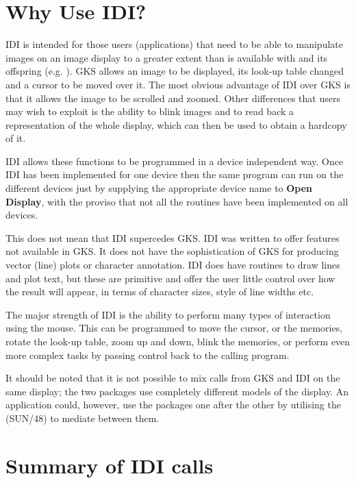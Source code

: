 \documentclass[11pt,nolof]{starlink}
\begin{document}
\scfrontmatter

\section{Why Use IDI?}

IDI is intended for those users (applications) that need to be able to
manipulate images on an image display to a greater extent than is
available with  and its offspring (e.g.
). GKS allows an image to
be displayed, its look-up table changed and a cursor to be moved over it.
The most obvious advantage of IDI over GKS is that it allows the image
to be scrolled and zoomed. Other differences that users may wish to exploit
is the ability to blink images and to read back a representation of
the whole display, which can then be used to obtain a hardcopy of it.

IDI allows these functions to be programmed in a device independent way.
Once IDI has been implemented for one device then the same program can
run on the different devices just by supplying the appropriate device name
to \textbf{Open Display}, with the proviso that not all the routines have
been implemented on all devices.

This does not mean that IDI supercedes GKS. IDI was written to offer
features not available in GKS. It does not have the sophistication of
GKS for producing vector (line) plots or character annotation. IDI
does have routines to draw lines and plot text, but these are primitive
and offer the user little control over how the result will appear, in
terms of character sizes, style of line widths etc.

The major strength of IDI is the ability to perform many types of
interaction using the mouse. This can be programmed to move the cursor,
or the memories, rotate the look-up table, zoom up and down, blink the
memories, or perform even more complex tasks by passing control back
to the calling program.

It should be noted that it is not possible to mix calls from GKS and IDI
on the same display; the two packages use completely different models
of the display. An application could, however, use the packages one after
the other by utilising the  (SUN/48) to mediate between them.


\section{Summary of IDI calls}
\end{document}
